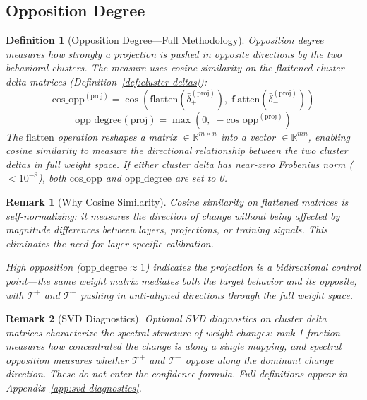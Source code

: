 \documentclass[11pt]{article}
\newtheorem{definition}{Definition}[section]
\newtheorem{remark}{Remark}[section]
\begin{document}
\subsection{Opposition Degree}
\label{sec:opposition-degree}

\begin{definition}[Opposition Degree---Full Methodology]
\label{def:opposition-degree-full-methodology}
Opposition degree measures how strongly a projection is pushed in opposite directions by the two behavioral clusters. The measure uses cosine similarity on the flattened cluster delta matrices (Definition~\ref{def:cluster-deltas}):
\begin{equation}
\text{cos\_opp}^{(\text{proj})} = \cos\!\left(\text{flatten}(\bar{\delta}^{(\text{proj})}_+),\; \text{flatten}(\bar{\delta}^{(\text{proj})}_-)\right)
\end{equation}
\begin{equation}
\text{opp\_degree}(\text{proj}) = \max\!\left(0,\; -\text{cos\_opp}^{(\text{proj})}\right)
\end{equation}
The $\text{flatten}$ operation reshapes a matrix $\in \mathbb{R}^{m \times n}$ into a vector $\in \mathbb{R}^{mn}$, enabling cosine similarity to measure the directional relationship between the two cluster deltas in full weight space. If either cluster delta has near-zero Frobenius norm ($< 10^{-8}$), both $\text{cos\_opp}$ and $\text{opp\_degree}$ are set to 0.
\end{definition}

\begin{remark}[Why Cosine Similarity]
\label{rem:why-cosine-similarity}
Cosine similarity on flattened matrices is self-normalizing: it measures the \emph{direction} of change without being affected by magnitude differences between layers, projections, or training signals. This eliminates the need for layer-specific calibration.

High opposition ($\text{opp\_degree} \approx 1$) indicates the projection is a bidirectional control point---the same weight matrix mediates both the target behavior and its opposite, with $\mathcal{T}^+$ and $\mathcal{T}^-$ pushing in anti-aligned directions through the full weight space.
\end{remark}

\begin{remark}[SVD Diagnostics]
Optional SVD diagnostics on cluster delta matrices characterize the spectral structure of weight changes: rank-1 fraction measures how concentrated the change is along a single mapping, and spectral opposition measures whether $\mathcal{T}^+$ and $\mathcal{T}^-$ oppose along the dominant change direction. These do not enter the confidence formula. Full definitions appear in Appendix~\ref{app:svd-diagnostics}.
\end{remark}
\end{document}
